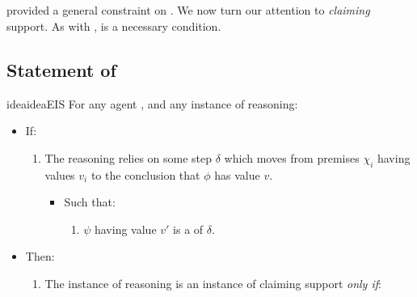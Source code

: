 \section{}
\label{sec:ideaCS}

\begin{note}
  \ideaS{} provided a general constraint on \support{}.
  We now turn our attention to \emph{claiming} support.
  As with \ideaS{}, \ideaCS{} is a necessary condition.
\end{note}

\subsection{Statement of \ideaCS{}}
\label{sec:ideaCS:statement}

\begin{note}
  \begin{restatable}{idea}{ideaEIS}
    \label{idea:CS:B}
    For any agent \vAgent{}, and any instance of reasoning:
    \begin{itemize}[leftmargin=*]
    \item
      If:
      \begin{enumerate}[label=\arabic*., ref=(\arabic*)]
      \item
        \label{idea:CS:B:step}
        The reasoning relies on some step \(\delta\) which moves from premises \(\chi_{i}\) having values \(v_{i}\) to the conclusion that \(\phi\) has value \(v\).
        \begin{itemize}
        \item
          Such that:
          \begin{enumerate}[label=\alph*., ref=(\alph*)]
          \item
            \label{idea:CS:B:step:requ}
            \(\psi\) having value \(v'\) is a \emph{\requ{}} of \(\delta\).
          \end{enumerate}
        \end{itemize}
      \end{enumerate}
    \item
      Then:
      \begin{enumerate}[label=\arabic*., ref=(\arabic*)]
      \item
        The instance of reasoning is an instance of claiming support \emph{only if}:
        \begin{enumerate}[label=\alph*., ref=(\alph*)]
          \setcounter{enumii}{1}

\end{enumerate}
\end{enumerate}
\end{itemize}
\end{restatable}
\end{note}
